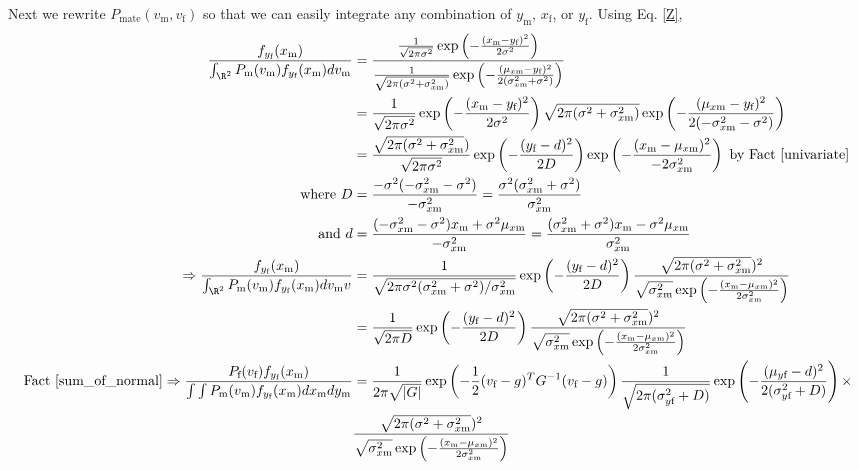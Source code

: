 \documentclass{article}
\newcommand{\x}[1]{\text{#1}}
\begin{document}
\begin{pf}
Next we rewrite $P_\text{mate}(v_\x{m},v_\x{f})$ so that we can easily integrate any combination of $y_\x{m}$, $x_\x{f}$, or $y_\x{f}$. Using Eq. \ref{Z}, 
\begin{align}
\frac{f_{y_\x{f}}(x_\x{m})}{\int_{\R^2}P_\x{m}(v_\x{m})f_{y_\x{f}}(x_\x{m})dv_\x{m}}&=\frac{\frac{1}{\sqrt{2\pi\sigma^2}}\exp\left(-\frac{(x_\x{m}-y_\x{f})^2}{2\sigma^2}\right)}{\frac{1}{\sqrt{2\pi(\sigma^2+\sigma_{x\x{m}}^2)}}\exp\left(-\frac{(\mu_{x\x{m}}-y_\x{f})^2}{2(\sigma_{x\x{m}}^2+\sigma^2)}\right)} \notag
\\&=\frac{1}{\sqrt{2\pi\sigma^2}}\exp\left(-\frac{(x_\x{m}-y_\x{f})^2}{2\sigma^2}\right)\sqrt{2\pi(\sigma^2+\sigma_{x\x{m}}^2)}\exp\left(-\frac{(\mu_{x\x{m}}-y_\x{f})^2}{2(-\sigma_{x\x{m}}^2-\sigma^2)}\right)
\notag\\&=\frac{\sqrt{2\pi(\sigma^2+\sigma_{x\x{m}}^2})}{\sqrt{2\pi\sigma^2}}\exp\left(-\frac{(y_\x{f}-d)^2}{2D}\right)\exp\left(-\frac{(x_\x{m}-\mu_{x\x{m}})^2}{-2\sigma_{x\x{m}}^2}\right)\text{ by Fact \ref{univariate}}
\notag\\ \text{ where } D&=\frac{-\sigma^2(-\sigma_{x\x{m}}^2-\sigma^2)}{-\sigma_{x\x{m}}^2}=\frac{\sigma^2(\sigma_{x\x{m}}^2+\sigma^2)}{\sigma_{x\x{m}}^2}  \label{D}
\\\text{ and } d&=\frac{(-\sigma_{x\x{m}}^2-\sigma^2)x_\x{m}+\sigma^2\mu_{x\x{m}}}{-\sigma_{x\x{m}}^2}=\frac{(\sigma_{x\x{m}}^2+\sigma^2)x_\x{m}-\sigma^2\mu_{x\x{m}}}{\sigma_{x\x{m}}^2}
\notag\\ \Rightarrow \frac{f_{y_\x{f}}(x_\x{m})}{\int_{\R^2}P_\x{m}(v_\x{m})f_{y_\x{f}}(x_\x{m})dv_\x{m}v}&=\frac{1}{\sqrt{2\pi \sigma^2(\sigma_{x\x{m}}^2+\sigma^2)/\sigma_{x\x{m}}^2}}\exp\left(-\frac{(y_\x{f}-d)^2}{2D}\right)\frac{\sqrt{2\pi(\sigma^2+\sigma_{x\x{m}}^2})^2}{\sqrt{\sigma_{x\x{m}}^2}\exp\left(-\frac{(x_\x{m}-\mu_{x\x{m}})^2}{2\sigma_{x\x{m}}^2}\right)}
\notag\\&=\frac{1}{\sqrt{2\pi D}}\exp\left(-\frac{(y_\x{f}-d)^2}{2D}\right)\frac{\sqrt{2\pi(\sigma^2+\sigma_{x\x{m}}^2})^2}{\sqrt{\sigma_{x\x{m}}^2}\exp\left(-\frac{(x_\x{m}-\mu_{x\x{m}})^2}{2\sigma_{x\x{m}}^2}\right)}
\notag\\\text{Fact \ref{sum_of_normal}}\Rightarrow \frac{P_\x{f}(v_\x{f})f_{y_\x{f}}(x_\x{m})}{\int\int P_\x{m}(v_\x{m})f_{y_\x{f}}(x_\x{m})dx_\x{m}dy_\x{m}}&=\frac{1}{2\pi\sqrt{|G|}}\exp\left(-\frac{1}{2}(v_\x{f}-g)^TG^{-1}(v_\x{f}-g)\right)\frac{1}{\sqrt{2\pi(\sigma_{y\x{f}}^2+D)}}\exp\left(-\frac{(\mu_{y\x{f}}-d)^2}{2(\sigma_{y\x{f}}^2+D)}\right)\times
\notag\\&\frac{\sqrt{2\pi(\sigma^2+\sigma_{x\x{m}}^2})^2}{\sqrt{\sigma_{x\x{m}}^2}\exp\left(-\frac{(x_\x{m}-\mu_{x\x{m}})^2}{2\sigma_{x\x{m}}^2}\right)} 

\end{align}
\end{pf}
\end{document}
